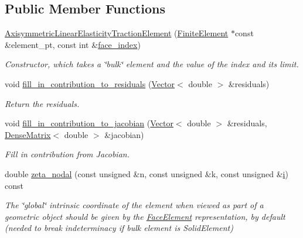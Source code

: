 \subsection*{Public Member Functions}
\begin{DoxyCompactItemize}
\item 
\hyperlink{classoomph_1_1AxisymmetricLinearElasticityTractionElement_a9b68dc55eee5ecabeaaab18d47af9008}{Axisymmetric\+Linear\+Elasticity\+Traction\+Element} (\hyperlink{classoomph_1_1FiniteElement}{Finite\+Element} $\ast$const \&element\+\_\+pt, const int \&\hyperlink{classoomph_1_1FaceElement_a478d577ac6db67ecc80f1f02ae3ab170}{face\+\_\+index})
\begin{DoxyCompactList}\small\item\em Constructor, which takes a \char`\"{}bulk\char`\"{} element and the value of the index and its limit. \end{DoxyCompactList}\item 
void \hyperlink{classoomph_1_1AxisymmetricLinearElasticityTractionElement_aeaffd515a63ba1bfc91868005545ef55}{fill\+\_\+in\+\_\+contribution\+\_\+to\+\_\+residuals} (\hyperlink{classoomph_1_1Vector}{Vector}$<$ double $>$ \&residuals)
\begin{DoxyCompactList}\small\item\em Return the residuals. \end{DoxyCompactList}\item 
void \hyperlink{classoomph_1_1AxisymmetricLinearElasticityTractionElement_a2a94d08c2f96f71ecd6edcfdfbceb4ab}{fill\+\_\+in\+\_\+contribution\+\_\+to\+\_\+jacobian} (\hyperlink{classoomph_1_1Vector}{Vector}$<$ double $>$ \&residuals, \hyperlink{classoomph_1_1DenseMatrix}{Dense\+Matrix}$<$ double $>$ \&jacobian)
\begin{DoxyCompactList}\small\item\em Fill in contribution from Jacobian. \end{DoxyCompactList}\item 
double \hyperlink{classoomph_1_1AxisymmetricLinearElasticityTractionElement_a1eeca70977b3ba93cffc2d811b054a9a}{zeta\+\_\+nodal} (const unsigned \&n, const unsigned \&k, const unsigned \&\hyperlink{cfortran_8h_adb50e893b86b3e55e751a42eab3cba82}{i}) const
\begin{DoxyCompactList}\small\item\em The \char`\"{}global\char`\"{} intrinsic coordinate of the element when viewed as part of a geometric object should be given by the \hyperlink{classoomph_1_1FaceElement}{Face\+Element} representation, by default (needed to break indeterminacy if bulk element is Solid\+Element) \end{DoxyCompactList}\item 

\end{DoxyCompactItemize}
